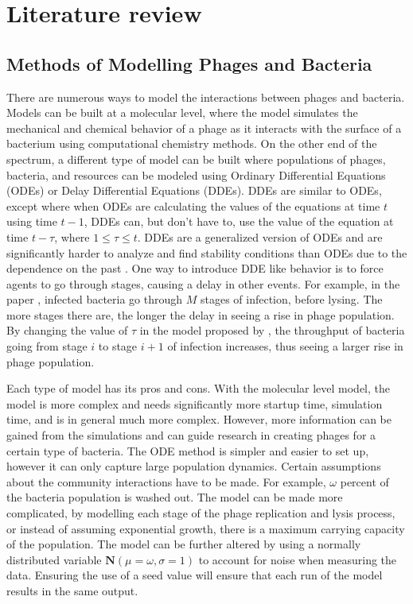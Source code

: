\chapter{Literature review}
\label{LR}

\section{Methods of Modelling Phages and Bacteria}
There are numerous ways to model the interactions between phages and bacteria.
Models can be built at a molecular level, where the model simulates the mechanical and chemical behavior of a phage as it interacts with the surface of a bacterium using computational chemistry methods.
On the other end of the spectrum, a different type of model can be built where populations of phages, bacteria, and resources can be modeled using Ordinary Differential Equations (ODEs) or Delay Differential Equations (DDEs).
DDEs are similar to ODEs, except where when ODEs are calculating the values of the equations at time $t$ using time $t-1$, DDEs can, but don't have to, use the value of the equation at time $t-\tau$, where $1 \leq \tau \leq t$. 
DDEs are a generalized version of ODEs and are significantly harder to analyze and find stability conditions than ODEs due to the dependence on the past \cite{liExploringComplicatedBehaviors2023}. \newline
One way to introduce DDE like behavior is to force agents to go through stages, causing a delay in other events. 
For example, in the paper \citet{gengUsingBacterialPopulation2024}, infected bacteria go through $M$ stages of infection, before lysing. 
The more stages there are, the longer the delay in seeing a rise in phage population. By changing the value of $\tau$ in the model proposed by \citet{gengUsingBacterialPopulation2024}, the throughput of bacteria going from stage $i$ to stage $i+1$ of infection increases, thus seeing a larger rise in phage population. 

Each type of model has its pros and cons.
With the molecular level model, the model is more complex and needs significantly more startup time, simulation time, and is in general much more complex.
However, more information can be gained from the simulations and can guide research in creating phages for a certain type of bacteria.
The ODE method is simpler and easier to set up, however it can only capture large population dynamics.
Certain assumptions about the community interactions have to be made.
For example, $\omega$ percent of the bacteria population is washed out.
The model can be made more complicated, by modelling each stage of the phage replication and lysis process, or instead of assuming exponential growth, there is a maximum carrying capacity of the population.
The model can be further altered by using a normally distributed variable $\textbf{N}(\mu=\omega, \sigma=1)$ to account for noise when measuring the data. 
Ensuring the use of a seed value will ensure that each run of the model results in the same output. 


